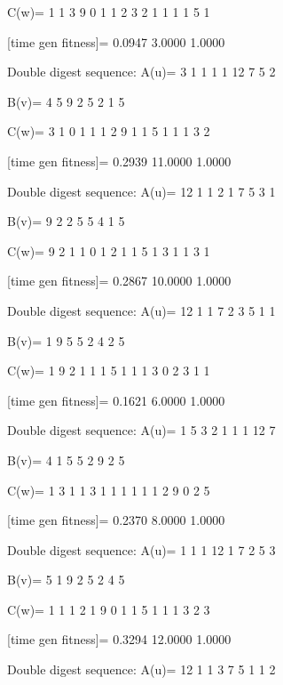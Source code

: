 C(w)=
     1     1     3     9     0     1     1     2     3     2     1     1     1     1     5     1

[time gen fitness]=
    0.0947    3.0000    1.0000

Double digest sequence:
A(u)=
     3     1     1     1     1    12     7     5     2

B(v)=
     4     5     9     2     5     2     1     5

C(w)=
     3     1     0     1     1     1     2     9     1     1     5     1     1     1     3     2

[time gen fitness]=
    0.2939   11.0000    1.0000

Double digest sequence:
A(u)=
    12     1     1     2     1     7     5     3     1

B(v)=
     9     2     2     5     5     4     1     5

C(w)=
     9     2     1     1     0     1     2     1     1     5     1     3     1     1     3     1

[time gen fitness]=
    0.2867   10.0000    1.0000

Double digest sequence:
A(u)=
    12     1     1     7     2     3     5     1     1

B(v)=
     1     9     5     5     2     4     2     5

C(w)=
     1     9     2     1     1     1     5     1     1     1     3     0     2     3     1     1

[time gen fitness]=
    0.1621    6.0000    1.0000

Double digest sequence:
A(u)=
     1     5     3     2     1     1     1    12     7

B(v)=
     4     1     5     5     2     9     2     5

C(w)=
     1     3     1     1     3     1     1     1     1     1     1     2     9     0     2     5

[time gen fitness]=
    0.2370    8.0000    1.0000

Double digest sequence:
A(u)=
     1     1     1    12     1     7     2     5     3

B(v)=
     5     1     9     2     5     2     4     5

C(w)=
     1     1     1     2     1     9     0     1     1     5     1     1     1     3     2     3

[time gen fitness]=
    0.3294   12.0000    1.0000

Double digest sequence:
A(u)=
    12     1     1     3     7     5     1     1     2

